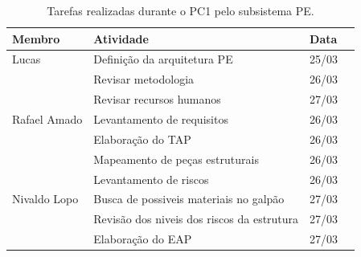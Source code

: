 \begin{table}[h]
  \begin{center}
  \caption{\label{tarefas}Tarefas realizadas durante o PC1 pelo subsistema PE.}
  \begin{tabular}{|l|l|l|l|}
  \hline
  \textbf{Membro} & \textbf{Atividade} & \textbf{Data} \\ \hline\hline
  Lucas & Definição da arquitetura PE & 25/03 \\ \hline
   & Revisar metodologia & 26/03 \\ \hline
   & Revisar recursos humanos & 27/03 \\ \hline
  Rafael Amado  & Levantamento de requisitos  & 26/03 \\ \hline
   & Elaboração do TAP & 26/03 \\ \hline
   & Mapeamento de peças estruturais & 26/03 \\ \hline
   & Levantamento de riscos & 26/03 \\ \hline
  Nivaldo Lopo  & Busca de possiveis materiais no galpão & 27/03 \\ \hline
   & Revisão dos niveis dos riscos da estrutura & 27/03 \\ \hline
   & Elaboração do EAP & 27/03 \\ \hline
  \end{tabular}
  \end{center}
\end{table}

